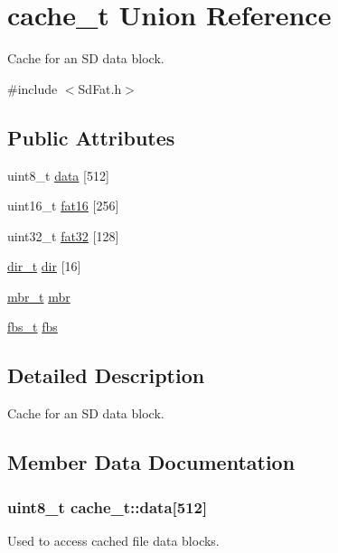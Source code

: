 \hypertarget{unioncache__t}{}\section{cache\+\_\+t Union Reference}
\label{unioncache__t}


Cache for an S\+D data block.  




{\ttfamily \#include $<$Sd\+Fat.\+h$>$}

\subsection*{Public Attributes}
\begin{DoxyCompactItemize}
\item 
uint8\+\_\+t \hyperlink{unioncache__t_ae675b7a3a87d809070de111d1d1f1d81}{data} \mbox{[}512\mbox{]}
\item 
uint16\+\_\+t \hyperlink{unioncache__t_a8f3a4e9392a7d8ace954fc44c57df887}{fat16} \mbox{[}256\mbox{]}
\item 
uint32\+\_\+t \hyperlink{unioncache__t_a57e16421bf460d1ba6cb9ce9a23a4a83}{fat32} \mbox{[}128\mbox{]}
\item 
\hyperlink{_fat_structs_8h_a803db59d4e16a0c54a647afc6a7954e3}{dir\+\_\+t} \hyperlink{unioncache__t_a7396fdbdb7c52bd1d72c5329ff32acd1}{dir} \mbox{[}16\mbox{]}
\item 
\hyperlink{_fat_structs_8h_a7c429e5097f101c8c97663d6c4155bd9}{mbr\+\_\+t} \hyperlink{unioncache__t_a6ac10bfb1ebb1139c448456679663bb6}{mbr}
\item 
\hyperlink{_fat_structs_8h_a91a3979f1149ff688d0d8bb696bc2887}{fbs\+\_\+t} \hyperlink{unioncache__t_a0691515e5d969f98c4285bfe0c16a309}{fbs}
\end{DoxyCompactItemize}


\subsection{Detailed Description}
Cache for an S\+D data block. 

\subsection{Member Data Documentation}
\hypertarget{unioncache__t_ae675b7a3a87d809070de111d1d1f1d81}{}
\subsubsection[{data}]{\setlength{\rightskip}{0pt plus 5cm}uint8\+\_\+t cache\+\_\+t\+::data\mbox{[}512\mbox{]}}\label{unioncache__t_ae675b7a3a87d809070de111d1d1f1d81}
Used to access cached file data blocks. \hypertarget{unioncache__t_a7396fdbdb7c52bd1d72c5329ff32acd1}{}
